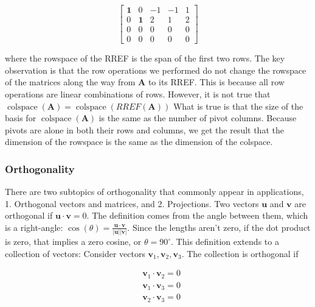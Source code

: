 \documentclass[main.tex]{subfiles}
\begin{document}
    $$
    \left[\begin{array}{ccccc}
    \mathbf{1} & 0 & -1 & -1 & 1 \\
    0 & \mathbf{1} & 2 & 1 & 2 \\
    0 & 0 & 0 & 0 & 0 \\
    0 & 0 & 0 & 0 & 0
    \end{array}\right]
    $$
    
    where the rowspace of the RREF is the span of the first two rows. The key observation is that the row operations we performed do not change the rowspace of the matrices along the way from $\mathbf{A}$ to its RREF. This is because all row operations are linear combinations of rows. However, it is not true that $\operatorname{colspace}(\mathbf{A})=\operatorname{colspace}(R R E F(\mathbf{A}))$ What is true is that the size of the basis for $\operatorname{colspace}(\mathbf{A})$ is the same as the number of pivot columns. Because pivots are alone in both their rows and columns, we get the result that the dimension of the rowspace is the same as the dimension of the colspace.

    \subsubsection{Orthogonality}
    
    There are two subtopics of orthogonality that commonly appear in applications, 1. Orthogonal vectors and matrices, and 2. Projections. Two vectors $\mathbf{u}$ and $\mathbf{v}$ are orthogonal if $\mathbf{u} \cdot \mathbf{v}=0$. The definition comes from the angle between them, which is a right-angle: $\cos (\theta)=\frac{\mathbf{u} \cdot \mathbf{v}}{|\mathbf{u}||\mathbf{v}|}$. Since the lengths aren't zero, if the dot product is zero, that implies a zero cosine, or $\theta=90^{\circ}$. This definition extends to a collection of vectors: Consider vectors $\mathbf{v}_{1}, \mathbf{v}_{2}, \mathbf{v}_{3}$. The collection is orthogonal if 
    
    $$
    \begin{aligned}
    &\mathbf{v}_{1} \cdot \mathbf{v}_{2}=0 \\
    &\mathbf{v}_{1} \cdot \mathbf{v}_{3}=0 \\
    &\mathbf{v}_{2} \cdot \mathbf{v}_{3}=0
    \end{aligned}
    $$
    
\end{document}
